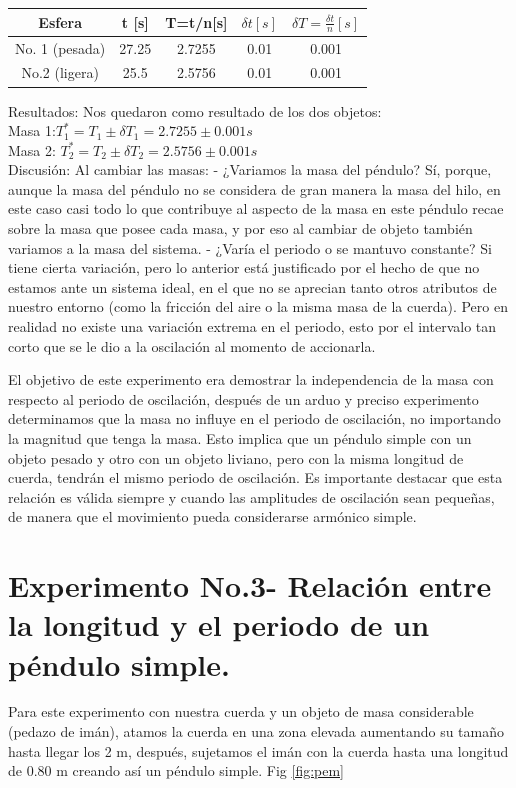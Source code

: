\documentclass[10pt]{article}
\begin{document}
\begin{multicols}{2}
\begin{center}
	\begin{adjustbox}{width=245pt}
		\begin{tabular}{|c|c|c|c|c|}
			\hline
			Esfera	&t [s]	&T=t/n[s]&	$\delta t[s]$	&$\delta T= \frac{\delta t}{n}[s]$\\
			\hline
			No. 1 (pesada)&	27.25	&2.7255&	0.01	&0.001 \\
			\hline
			No.2 (ligera)&	25.5&	2.5756&	0.01&	0.001 \\
			\hline
		\end{tabular}
	\end{adjustbox}
\end{center}
Resultados: 
Nos quedaron como resultado de los dos objetos:\\
Masa 1:$ T_{1}^{*}=T_{1}\pm \delta T_{1}=2.7255\pm 0.001 s $\\
Masa 2: $T_{2}^{*}=T_{2}\pm \delta T_{2}=2.5756\pm 0.001 s $\\
Discusión: 
Al cambiar las masas:
- ¿Variamos la masa del péndulo?
Sí, porque, aunque la masa del péndulo no se considera de gran manera la masa del hilo, en este caso casi todo lo que contribuye al aspecto de la masa en este péndulo recae sobre la masa que posee cada masa, y por eso al cambiar de objeto también variamos a la masa del sistema.
- ¿Varía el periodo o se mantuvo constante?
Si tiene cierta variación, pero lo anterior está justificado por el hecho de que no estamos ante un sistema ideal, en el que no se aprecian tanto otros atributos de nuestro entorno (como la fricción del aire o la misma masa de la cuerda).
Pero en realidad no existe una variación extrema en el periodo, esto por el intervalo tan corto que se le dio a la oscilación al momento de accionarla.


El objetivo de este experimento era demostrar la independencia de la masa con respecto al periodo de oscilación, después de un arduo y preciso experimento determinamos que la masa no influye en el periodo de oscilación, no importando la magnitud que tenga la masa. Esto implica que un péndulo simple con un objeto pesado y otro con un objeto liviano, pero con la misma longitud de cuerda, tendrán el mismo periodo de oscilación.
Es importante destacar que esta relación es válida siempre y cuando las amplitudes de oscilación sean pequeñas, de manera que el movimiento pueda considerarse armónico simple.

\section{Experimento No.3- Relación entre la longitud y el periodo de un péndulo simple.}
Para este experimento con nuestra cuerda y un objeto de masa considerable (pedazo de imán), atamos la cuerda en una zona elevada aumentando su tamaño hasta llegar los 2 m, después, sujetamos el imán con la cuerda hasta una longitud de 0.80 m creando así un péndulo simple. Fig \ref{fig:pem}


\end{multicols}
\end{document}
